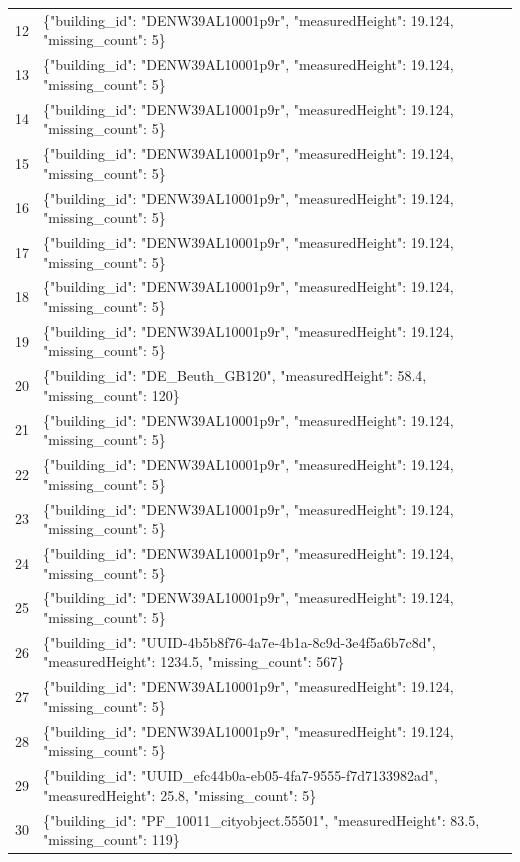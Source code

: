 \documentclass[a4paper,11pt]{article}
\begin{document}
\begin{table}[ht]
\begin{tabular}{r p{12cm}}
12 & \{"building\_id": "DENW39AL10001p9r", "measuredHeight": 19.124, "missing\_count": 5\} \\
13 & \{"building\_id": "DENW39AL10001p9r", "measuredHeight": 19.124, "missing\_count": 5\} \\
14 & \{"building\_id": "DENW39AL10001p9r", "measuredHeight": 19.124, "missing\_count": 5\} \\
15 & \{"building\_id": "DENW39AL10001p9r", "measuredHeight": 19.124, "missing\_count": 5\} \\
16 & \{"building\_id": "DENW39AL10001p9r", "measuredHeight": 19.124, "missing\_count": 5\} \\
17 & \{"building\_id": "DENW39AL10001p9r", "measuredHeight": 19.124, "missing\_count": 5\} \\
18 & \{"building\_id": "DENW39AL10001p9r", "measuredHeight": 19.124, "missing\_count": 5\} \\
19 & \{"building\_id": "DENW39AL10001p9r", "measuredHeight": 19.124, "missing\_count": 5\} \\
20 & \{"building\_id": "DE\_Beuth\_GB120", "measuredHeight": 58.4, "missing\_count": 120\} \\
21 & \{"building\_id": "DENW39AL10001p9r", "measuredHeight": 19.124, "missing\_count": 5\} \\
22 & \{"building\_id": "DENW39AL10001p9r", "measuredHeight": 19.124, "missing\_count": 5\} \\
23 & \{"building\_id": "DENW39AL10001p9r", "measuredHeight": 19.124, "missing\_count": 5\} \\
24 & \{"building\_id": "DENW39AL10001p9r", "measuredHeight": 19.124, "missing\_count": 5\} \\
25 & \{"building\_id": "DENW39AL10001p9r", "measuredHeight": 19.124, "missing\_count": 5\} \\
26 & \{"building\_id": "UUID-4b5b8f76-4a7e-4b1a-8c9d-3e4f5a6b7c8d", "measuredHeight": 1234.5, "missing\_count": 567\} \\
27 & \{"building\_id": "DENW39AL10001p9r", "measuredHeight": 19.124, "missing\_count": 5\} \\
28 & \{"building\_id": "DENW39AL10001p9r", "measuredHeight": 19.124, "missing\_count": 5\} \\
29 & \{"building\_id": "UUID\_efc44b0a-eb05-4fa7-9555-f7d7133982ad", "measuredHeight": 25.8, "missing\_count": 5\} \\
30 & \{"building\_id": "PF\_10011\_cityobject.55501", "measuredHeight": 83.5, "missing\_count": 119\} \\

\end{tabular}
\end{table}
\end{document}
